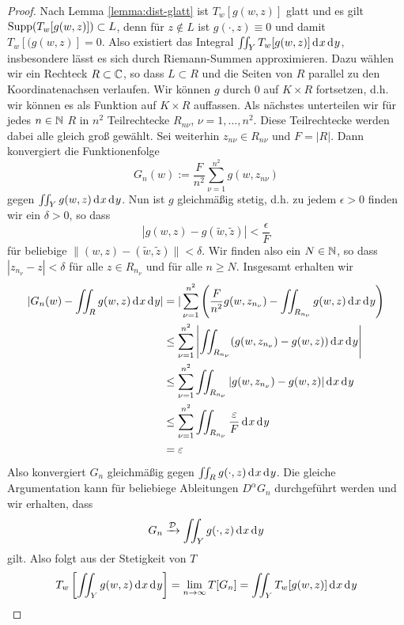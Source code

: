 \begin{proof}
  Nach Lemma \ref{lemma:dist-glatt} ist $T_w[g(w,z)]$ glatt und es
  gilt $\operatorname{Supp}(T_w[g(w,z)]) \subset L$, denn für $z \notin L$ ist
  $g(\cdot, z) \equiv 0$ und damit $T_w[(g(w,z)] = 0$. 
  Also existiert das Integral $\iint_Y T_w[g(w,z)] \d[x]\d[y]$,
  insbesondere lässt es sich durch Riemann-Summen approximieren. 
  Dazu wählen wir ein Rechteck $R \subset \mathbb{C}$, so dass $L \subset R$
  und die Seiten von $R$ parallel zu den Koordinatenachsen
  verlaufen. 
  Wir können $g$ durch 0 auf $K \times R$ fortsetzen, d.h. wir können
  es als Funktion auf $K \times R$ auffassen. 
  Als nächstes unterteilen wir für jedes $n \in \mathbb{N}$ $R$ in $n^2$
  Teilrechtecke $R_{n\nu}$, $\nu = 1, \dots, n^2$. Diese Teilrechtecke
  werden dabei alle gleich groß gewählt. Sei weiterhin $z_{n\nu}
  \in R_{n \nu}$ und $F = |R|$. 
  Dann konvergiert die Funktionenfolge
  \[
  G_n(w) := \frac{F}{n^2} \sum_{\nu=1}^{n^2} g(w, z_{n\nu})
  \]
  gegen $\iint_Y g(w,z) \d[x]\d[y]$. Nun ist $g$ gleichmäßig stetig,
  d.h. zu jedem $\epsilon > 0$ finden wir ein $\delta >0$, so dass
  \[
  | g(w,z) - g(\tilde w, \tilde z) | < \frac{\epsilon}{F}
  \]
  für beliebige $\| (w,z) - (\tilde w, \tilde z) \| < \delta$. Wir
  finden also ein $N \in \mathbb{N}$, so dass $|z_{n_\nu} - z| < \delta$ für
  alle $z \in R_{n_\nu}$ und für alle $n \geq N$. Insgesamt erhalten
  wir
  \begin{align*}
    |G_n(w) - \iint_R g(w,z) \d[x]\d[y]| & = | \sum_{\nu = 1}^{n^2}
    \left ( \frac{F}{n^2} g(w, z_{n_\nu}) - \iint_{R_{n_\nu}} g(w,z)
      \d[x]\d[y] \right ) \\
    & \leq \sum_{\nu=1}^{n^2} \left | \iint_{R_{n_\nu}}
      (g(w,z_{n_\nu}) - g(w,z)) \d[x]\d[y] \right | \\
    & \leq \sum_{\nu=1}^{n^2} \iint_{R_{n_\nu}} |g(w, z_{n_\nu}) -
    g(w,z)| \d[x]\d[y] \\
    & \leq \sum_{\nu=1}^{n^2} \iint_{R_{n_\nu}} \frac{\epsilon}{F}
    \d[x] \d[y] \\
    & = \epsilon
  \end{align*}
  Also konvergiert $G_n$ gleichmäßig gegen $\iint_R g(\cdot, z)
  \d[x]\d[y]$. Die gleiche Argumentation kann für beliebiege
  Ableitungen $D^\alpha G_n$ durchgeführt werden und wir erhalten,
  dass
  \[
  G_n \xrightarrow{\dist} \iint_Y g(\cdot, z) \d[x]\d[y]
  \]
  gilt. Also folgt aus der Stetigkeit von $T$
  \[
  T_w \left [ \iint_Y g(w, z) \d[x]\d[y] \right ] = \lim_{n \ra
    \infty} T[G_n] = \iint_Y T_w[g(w,z)] \d[x]\d[y]
  \]
\end{proof}

